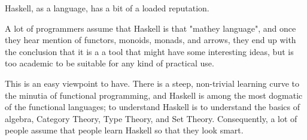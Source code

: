 \begin{foreword}

Haskell, as a language, has a bit of a loaded reputation.  

A lot of programmers assume that Haskell is that "mathey language", and once they hear mention of functors, monoids, monads, and arrows, they end up with the conclusion that it is a a tool that might have some interesting ideas, but is too academic to be suitable for any kind of practical use. 

This is an easy viewpoint to have.  There is a steep, non-trivial learning curve to the minutia of functional programming, and Haskell is among the most dogmatic of the functional languages; to understand Haskell is to understand the basics of algebra, Category Theory, Type Theory, and Set Theory.  Consequently, a lot of people assume that people learn Haskell so that they look smart. 



\end{foreword}

